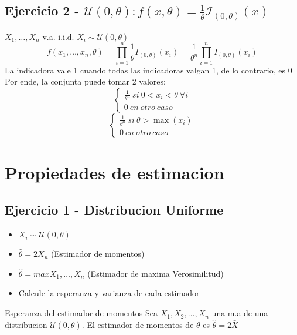 \documentclass[a4paper]{article}
\begin{document}
\subsection{Ejercicio 2 - $\mathcal{U}(0,\theta):f(x,\theta) = \frac{1}{\theta}\mathcal{I}_{(0,\theta)}(x)$}
$X_{1},\dots,X_{n}$ v.a. i.i.d. $X_{i} \sim \mathcal{U}(0,\theta)$
\begin{equation*}
    f(x_{1},\dots,x_{n}, \theta) = \prod_{i=1}^n \frac{1}{\theta}I_{(0,\theta)}(x_{i}) = \frac{1}{\theta^n}\prod_{i=1}^n I_{(0,\theta)}(x_{i})
\end{equation*}
La indicadora vale 1 cuando todas las indicadoras valgan 1, de lo contrario, es 0
Por ende, la conjunta puede tomar 2 valores:
\begin{equation*}
    \begin{cases}
        \frac{1}{\theta^n} \ si \ 0<x_{i}<\theta \  \forall i
        \\
        0 \ en \ otro \ caso
        \end{cases}
\end{equation*}
\begin{equation*}
    \begin{cases}
        \frac{1}{\theta^n} \ si \ \theta > \max(x_{i})
        \\
        0 \ en \ otro \ caso
        \end{cases}
\end{equation*}

\pagebreak

\section{Propiedades de estimacion}
\subsection{Ejercicio 1 - Distribucion Uniforme}
\begin{itemize}
    \item $X_i \sim \mathcal{U}(0, \theta)$
    \item $\widehat{\theta} = 2\bar{X}_n$ (Estimador de momentos)
    \item $\widehat{\theta} = max{X_{1},\dots,X_{n}}$ (Estimador de maxima Verosimilitud)
    \item Calcule la esperanza y varianza de cada estimador
\end{itemize}

Esperanza del estimador de momentos
Sea $X_{1},X_{2},\dots,X_{n}$ una m.a de una distribucion $\mathcal{U}(0, \theta)$. El estimador de momentos de $\theta$ es $\widehat{\theta} = 2\bar{X}$
\end{document}
